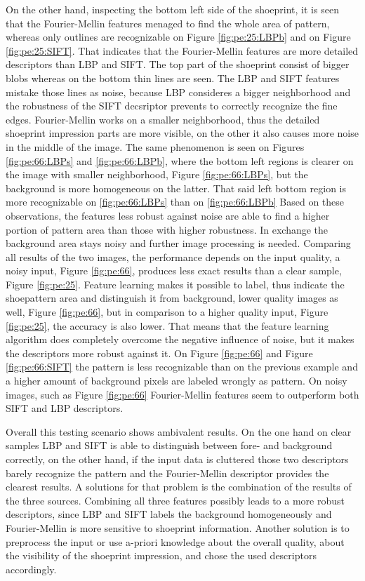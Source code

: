 \documentclass[draft,final]{vutinfth} %
\begin{document}
On the other hand, inspecting the bottom left side of the shoeprint, it is seen that the Fourier-Mellin features menaged to find the whole area of pattern, whereas only outlines are recognizable on Figure \ref{fig:pe:25:LBPb} and on Figure \ref{fig:pe:25:SIFT}.
That indicates that the Fourier-Mellin features are more detailed descriptors than LBP and SIFT. 
The top part of the shoeprint consist of bigger blobs whereas on the bottom thin lines are seen.
The LBP and SIFT features mistake those lines as noise, because LBP consideres a bigger neighborhood and the robustness of the SIFT decsriptor prevents to correctly recognize the fine edges.
Fourier-Mellin works on a smaller neighborhood, thus the detailed shoeprint impression parts are more visible, on the other it also causes more noise in the middle of the image.
The same phenomenon is seen on Figures  \ref{fig:pe:66:LBPs} and  \ref{fig:pe:66:LBPb}, where the bottom left regions is clearer on the image  with smaller neighborhood, Figure \ref{fig:pe:66:LBPs}, but the background is more homogeneous on the latter. 
That said left bottom region is more recognizable on  \ref{fig:pe:66:LBPs} than on  \ref{fig:pe:66:LBPb}
Based on these observations,  the features less robust against noise are able to find a higher portion of pattern area than those with higher robustness.
In exchange the background area stays noisy and further image processing is needed.
Comparing all results of the two images, the performance depends on the input quality, a noisy input, Figure \ref{fig:pe:66}, produces less exact results than a clear sample, Figure \ref{fig:pe:25}.
Feature learning makes it possible to label, thus indicate the shoepattern area and distinguish it from background, lower quality images as well,  Figure \ref{fig:pe:66}, but in comparison to a higher quality input, Figure \ref{fig:pe:25}, the accuracy is also lower.
That means that the feature learning algorithm does completely overcome the negative influence of noise, but it makes the descriptors more robust against it.
On Figure \ref{fig:pe:66} and Figure \ref{fig:pe:66:SIFT} the pattern is less recognizable than on the previous example and a higher amount of background pixels are labeled wrongly as pattern.
On noisy images, such as Figure \ref{fig:pe:66} Fourier-Mellin features seem to outperform both SIFT and LBP descriptors.
\par
Overall this testing scenario shows ambivalent results.
On the one hand on clear samples LBP and SIFT is able to distinguish between fore- and background correctly, on the other hand, if the input data is cluttered those two descriptors barely recognize the pattern and the Fourier-Mellin descriptor provides the clearest results.
A solutions for that problem is the combination of the results of the three sources.
Combining all three features possibly leads to a more robust  descriptors, since LBP and SIFT labels the background homogeneously and Fourier-Mellin is more sensitive to shoeprint information.
Another solution is to preprocess the input or use a-priori knowledge about the overall quality, about the visibility of the shoeprint impression, and chose the used descriptors accordingly.
\end{document}

